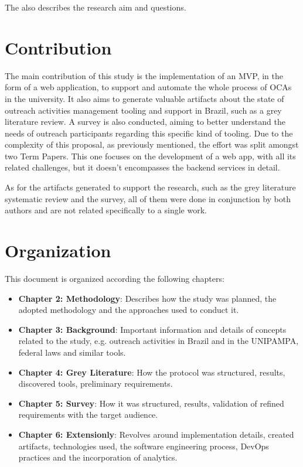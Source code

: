The  also describes the research aim and questions.



\section{Contribution}\label{sec:contribution}

The main contribution of this study is the implementation of an \ac{MVP}, in the form of a web application, to support and automate the whole process of \aclp{OCA} in the university. It also aims to generate valuable artifacts about the state of outreach activities management tooling and support in Brazil, such as a grey literature review. A survey is also conducted, aiming to better understand the needs of outreach participants regarding this specific kind of tooling. Due to the complexity of this proposal, as previously mentioned, the effort was split amongst two Term Papers. This one focuses on the development of a web app, with all its related challenges, but it doesn't encompasses the backend services in detail.

As for the artifacts generated to support the research, such as the grey literature systematic review and the survey, all of them were done in conjunction by both authors and are not related specifically to a single work.

\section{Organization}\label{sec:organization}

This document is organized according the following chapters:

\begin{itemize}
  \item \textbf{Chapter 2: Methodology}: Describes how the study was planned, the adopted methodology and the approaches used to conduct it.
  \item \textbf{Chapter 3: Background}: Important information and details of concepts related to the study, e.g. outreach activities in Brazil and in the \acl{UNIPAMPA}, federal laws and similar tools.
  \item \textbf{Chapter 4: Grey Literature}: How the protocol was structured, results, discovered tools, preliminary requirements.
  \item \textbf{Chapter 5: Survey}: How it was structured, results, validation of refined requirements with the target audience.
  \item \textbf{Chapter 6: Extensionly}: Revolves around implementation details, created artifacts, technologies used, the software engineering process, DevOps practices and the incorporation of analytics.
\end{itemize}
